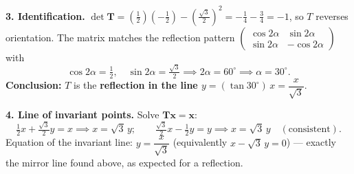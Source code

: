 \documentclass[11pt]{article}
\begin{document}
\begin{exoresolu}
\textbf{3. Identification.}
$\det \mathbf{T} = \left(\frac{1}{2}\right)\left(-\frac{1}{2}\right) - \left(\frac{\sqrt{3}}{2}\right)^{\!2} = -\frac{1}{4} - \frac{3}{4} = -1$, so $T$ reverses orientation. The matrix matches the reflection pattern $\begin{pmatrix} \cos 2\alpha & \sin 2\alpha \\ \sin 2\alpha & -\cos 2\alpha \end{pmatrix}$ with
\[
\cos 2\alpha = \tfrac12,\quad \sin 2\alpha = \tfrac{\sqrt3}{2} \implies 2\alpha = 60^\circ \implies \alpha = 30^\circ.
\]
\textbf{Conclusion:} $T$ is the \textbf{reflection in the line $y = (\tan 30^\circ)\,x = \dfrac{x}{\sqrt{3}}$}.

\textbf{4. Line of invariant points.}
Solve $\mathbf{T}\mathbf{x} = \mathbf{x}$:
\[
\tfrac{1}{2}x + \tfrac{\sqrt{3}}{2}y = x \implies x = \sqrt{3}\,y ; \qquad
\tfrac{\sqrt{3}}{2}x - \tfrac{1}{2}y = y \implies x = \sqrt{3}\,y \quad (\text{consistent}).
\]
Equation of the invariant line: $\boxed{y = \dfrac{x}{\sqrt{3}}}$ \; (equivalently $x - \sqrt{3}\,y = 0$) — exactly the mirror line found above, as expected for a reflection.
\end{exoresolu}
\end{document}
